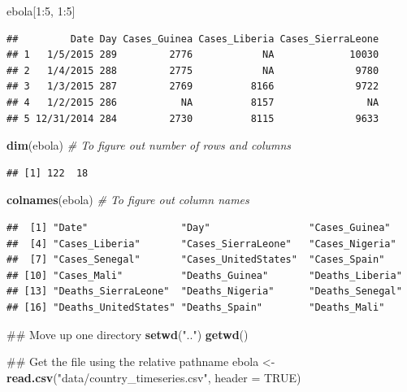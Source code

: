 \documentclass[]{book}
\makeatletter
\newenvironment{Shaded}{\begin{snugshade}}{\end{snugshade}}
\newcommand{\KeywordTok}[1]{\textcolor[rgb]{0.13,0.29,0.53}{\textbf{{#1}}}}
\newcommand{\DataTypeTok}[1]{\textcolor[rgb]{0.13,0.29,0.53}{{#1}}}
\newcommand{\DecValTok}[1]{\textcolor[rgb]{0.00,0.00,0.81}{{#1}}}
\newcommand{\StringTok}[1]{\textcolor[rgb]{0.31,0.60,0.02}{{#1}}}
\newcommand{\CommentTok}[1]{\textcolor[rgb]{0.56,0.35,0.01}{\textit{{#1}}}}
\newcommand{\OtherTok}[1]{\textcolor[rgb]{0.56,0.35,0.01}{{#1}}}
\newcommand{\NormalTok}[1]{{#1}}
\newenvironment{kframe}{%
\medskip{}
\setlength{\fboxsep}{.8em}
 \def\at@end@of@kframe{}%
 \ifinner\ifhmode%
  \def\at@end@of@kframe{\end{minipage}}%
  \begin{minipage}{\columnwidth}%
 \fi\fi%
 \def\FrameCommand##1{\hskip\@totalleftmargin \hskip-\fboxsep
 \colorbox{shadecolor}{##1}\hskip-\fboxsep
     \hskip-\linewidth \hskip-\@totalleftmargin \hskip\columnwidth}%
 \MakeFramed {\advance\hsize-\width
   \@totalleftmargin\z@ \linewidth\hsize
   \@setminipage}}%
 {\par\unskip\endMakeFramed%
 \at@end@of@kframe}
\renewenvironment{Shaded}{\begin{kframe}}{\end{kframe}}
\makeatother
\begin{document}
\begin{Shaded}
\begin{Highlighting}[]
\NormalTok{ebola[}\DecValTok{1}\NormalTok{:}\DecValTok{5}\NormalTok{, }\DecValTok{1}\NormalTok{:}\DecValTok{5}\NormalTok{]}
\end{Highlighting}
\end{Shaded}

\begin{verbatim}
##         Date Day Cases_Guinea Cases_Liberia Cases_SierraLeone
## 1   1/5/2015 289         2776            NA             10030
## 2   1/4/2015 288         2775            NA              9780
## 3   1/3/2015 287         2769          8166              9722
## 4   1/2/2015 286           NA          8157                NA
## 5 12/31/2014 284         2730          8115              9633
\end{verbatim}

\begin{Shaded}
\begin{Highlighting}[]
\KeywordTok{dim}\NormalTok{(ebola) }\CommentTok{# To figure out number of rows and columns}
\end{Highlighting}
\end{Shaded}

\begin{verbatim}
## [1] 122  18
\end{verbatim}

\begin{Shaded}
\begin{Highlighting}[]
\KeywordTok{colnames}\NormalTok{(ebola) }\CommentTok{# To figure out column names}
\end{Highlighting}
\end{Shaded}

\begin{verbatim}
##  [1] "Date"                "Day"                 "Cases_Guinea"       
##  [4] "Cases_Liberia"       "Cases_SierraLeone"   "Cases_Nigeria"      
##  [7] "Cases_Senegal"       "Cases_UnitedStates"  "Cases_Spain"        
## [10] "Cases_Mali"          "Deaths_Guinea"       "Deaths_Liberia"     
## [13] "Deaths_SierraLeone"  "Deaths_Nigeria"      "Deaths_Senegal"     
## [16] "Deaths_UnitedStates" "Deaths_Spain"        "Deaths_Mali"
\end{verbatim}

\begin{Shaded}
\begin{Highlighting}[]
\NormalTok{## Move up one directory}
\KeywordTok{setwd}\NormalTok{(}\StringTok{".."}\NormalTok{)}
\KeywordTok{getwd}\NormalTok{() }

\NormalTok{## Get the file using the relative pathname}
\NormalTok{ebola <-}\StringTok{ }\KeywordTok{read.csv}\NormalTok{(}\StringTok{"data/country_timeseries.csv"}\NormalTok{, }\DataTypeTok{header =} \OtherTok{TRUE}\NormalTok{) }
\end{Highlighting}
\end{Shaded}
\end{document}
